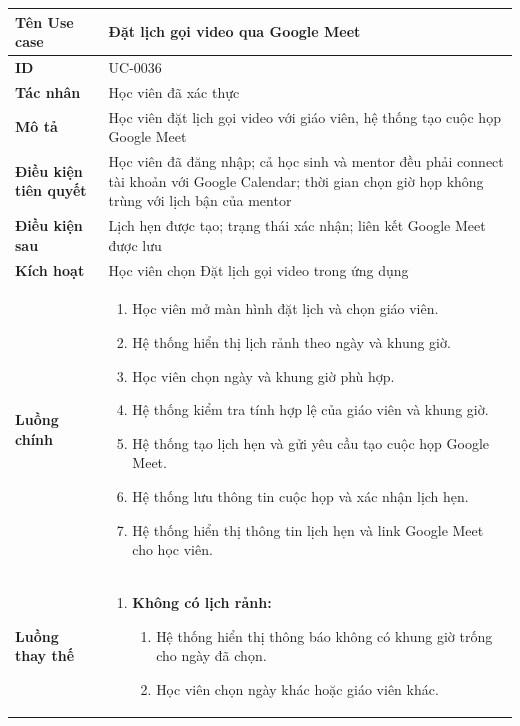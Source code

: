 {
\small
\renewcommand{\arraystretch}{1.15}

\begin{tabularx}{\textwidth}{|>{\raggedright\arraybackslash}p{3.5cm}|>{\raggedright\arraybackslash}X|}
\hline
\textbf{Tên Use case} & Đặt lịch gọi video qua Google Meet \\
\hline
\textbf{ID} & UC-0036 \\
\hline
\textbf{Tác nhân} & Học viên đã xác thực \\
\hline
\textbf{Mô tả} & Học viên đặt lịch gọi video với giáo viên, hệ thống tạo cuộc họp Google Meet \\
\hline
\textbf{Điều kiện tiên quyết} & Học viên đã đăng nhập; cả học sinh và mentor đều phải connect tài khoản với Google Calendar; thời gian chọn giờ họp không trùng với lịch bận của mentor \\
\hline
\textbf{Điều kiện sau} & Lịch hẹn được tạo; trạng thái xác nhận; liên kết Google Meet được lưu \\
\hline
\textbf{Kích hoạt} & Học viên chọn Đặt lịch gọi video trong ứng dụng \\
\hline
\textbf{Luồng chính} &
\begin{enumerate}
    \item Học viên mở màn hình đặt lịch và chọn giáo viên.
    \item Hệ thống hiển thị lịch rảnh theo ngày và khung giờ.
    \item Học viên chọn ngày và khung giờ phù hợp.
    \item Hệ thống kiểm tra tính hợp lệ của giáo viên và khung giờ.
    \item Hệ thống tạo lịch hẹn và gửi yêu cầu tạo cuộc họp Google Meet.
    \item Hệ thống lưu thông tin cuộc họp và xác nhận lịch hẹn.
    \item Hệ thống hiển thị thông tin lịch hẹn và link Google Meet cho học viên.
\end{enumerate} \\
\hline
\textbf{Luồng thay thế} &
\begin{enumerate}
    \item \textbf{Không có lịch rảnh:}
    \begin{enumerate}
        \item[2A.] Hệ thống hiển thị thông báo không có khung giờ trống cho ngày đã chọn.
        \item[3A.] Học viên chọn ngày khác hoặc giáo viên khác.
    \end{enumerate}

\end{enumerate}
\end{tabularx}}
